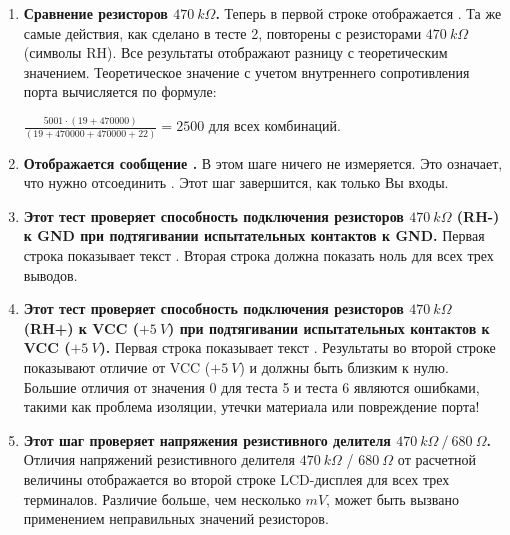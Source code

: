 \begin{enumerate}
\item \textbf{ Сравнение резисторов \(470~k\Omega\).}
Теперь в первой строке отображается . Та же самые действия, как сделано в тесте 2, повторены с 
резисторами \(470~k\Omega\) 
(символы RH).
Все результаты отображают разницу с теоретическим значением. Теоретическое значение с учетом внутреннего 
сопротивления порта вычисляется по формуле:

\(\frac{5001 \cdot (19 + 470000)}{ (19 + 470000 + 470000 + 22)} = 2500\) для всех комбинаций.

\item \textbf{ Отображается сообщение .}
В этом шаге ничего не измеряется. Это означает, что нужно отсоединить . 
Этот шаг завершится, как только Вы  входы.

\item \textbf{ Этот тест проверяет способность подключения резисторов \(470~k\Omega\) (RH-) к  GND при подтягивании 
испытательных контактов к GND.}
Первая строка показывает текст .
Вторая строка должна  показать ноль для всех трех выводов.

\item \textbf{ Этот тест проверяет способность подключения резисторов \(470~k\Omega\) (RH+) к VCC (\(+5~V\)) при 
подтягивании испытательных контактов к VCC (\(+5~V\)).}
Первая строка показывает текст .
Результаты во второй строке показывают отличие от VCC (\(+5~V\)) и должны быть близким к нулю. 
Большие отличия от значения 0 для теста 5 и теста 6 являются ошибками, такими как проблема изоляции, утечки 
материала или повреждение порта! 

\item \textbf{ Этот шаг проверяет напряжения резистивного делителя \(470~k\Omega~/~680~\Omega\).}
Отличия напряжений  резистивного делителя \(470~k\Omega\) / \(680~\Omega\) от расчетной величины 
отображается  во второй строке LCD-дисплея для всех трех терминалов. Различие больше, чем 
несколько \(mV\), может быть вызвано применением неправильных значений резисторов.
 

\end{enumerate}
